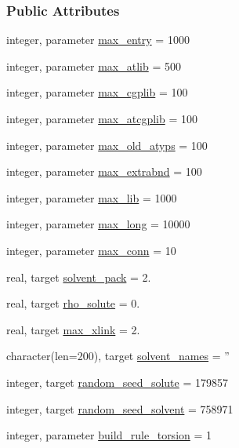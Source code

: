 \subsubsection*{Public Attributes}
\begin{DoxyCompactItemize}
\item 
integer, parameter \hyperlink{classprep_ac8c3b3f850c904ceb431889c42d85ee2}{max\-\_\-entry} = 1000
\item 
integer, parameter \hyperlink{classprep_a6772647467cb95a41202bbe0a01db5b7}{max\-\_\-atlib} = 500
\item 
integer, parameter \hyperlink{classprep_a72fc2af9b6f9249f3ef63a2f5e570f0a}{max\-\_\-cgplib} = 100
\item 
integer, parameter \hyperlink{classprep_a1e810276f7b8d213da60f190be18113c}{max\-\_\-atcgplib} = 100
\item 
integer, parameter \hyperlink{classprep_aa395d2a6f28f4a82d4f7faef27010bae}{max\-\_\-old\-\_\-atyps} = 100
\item 
integer, parameter \hyperlink{classprep_a0954fb2199580b767b0fec5e0d190eb0}{max\-\_\-extrabnd} = 100
\item 
integer, parameter \hyperlink{classprep_afddd5b41836da73acf6f6d7b66741283}{max\-\_\-lib} = 1000
\item 
integer, parameter \hyperlink{classprep_a1df01e5c34db215d69c53f52185163a5}{max\-\_\-long} = 10000
\item 
integer, parameter \hyperlink{classprep_ae00ce511ccdd1623a7fded5f4cdb237a}{max\-\_\-conn} = 10
\item 
real, target \hyperlink{classprep_abbddacbd376e8aca501f6151d3114a5c}{solvent\-\_\-pack} = 2.
\item 
real, target \hyperlink{classprep_ade49a05a54bea9b47761d04a3087afa5}{rho\-\_\-solute} = 0.
\item 
real, target \hyperlink{classprep_a85c4693cbc15c5614620bcc7d837e763}{max\-\_\-xlink} = 2.
\item 
character(len=200), target \hyperlink{classprep_a23cb9b5f1c2ed42421091cd8a8566d02}{solvent\-\_\-names} = ''
\item 
integer, target \hyperlink{classprep_a4e1a07eb57a103152818e73c1a23e65c}{random\-\_\-seed\-\_\-solute} = 179857
\item 
integer, target \hyperlink{classprep_a1a7de818be67e3e32a510b0bad624a5b}{random\-\_\-seed\-\_\-solvent} = 758971
\item 
integer, parameter \hyperlink{classprep_a853f496291d4e6336bc962adf492d392}{build\-\_\-rule\-\_\-torsion} = 1

\end{DoxyCompactItemize}
